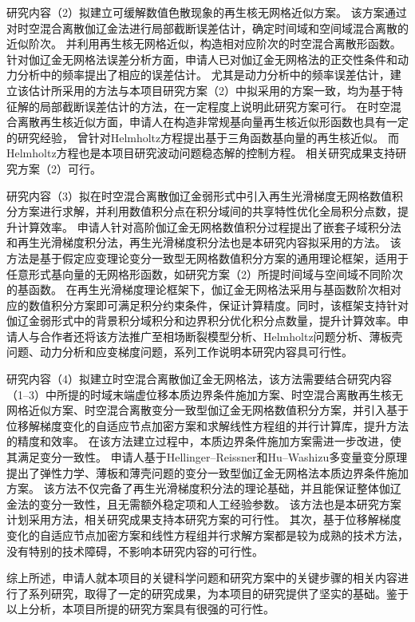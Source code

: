 研究内容（2）拟建立可缓解数值色散现象的再生核无网格近似方案。
该方案通过对时空混合离散伽辽金法进行局部截断误差估计，确定时间域和空间域混合离散的近似阶次。
并利用再生核无网格近似，构造相对应阶次的时空混合离散形函数。
针对伽辽金无网格法误差分析方面，申请人已对伽辽金无网格法的正交性条件\cite{wu2021}和动力分析中的频率\cite{wu2018a}提出了相应的误差估计。
尤其是动力分析中的频率误差估计，建立该估计所采用的方法与本项目研究方案（2）中拟采用的方案一致，均为基于特征解的局部截断误差估计的方法，在一定程度上说明此研究方案可行。
在时空混合离散再生核近似方面，申请人在构造非常规基向量再生核近似形函数也具有一定的研究经验，
曾针对Helmholtz方程提出基于三角函数基向量的再生核近似\cite{wang2020b}。
而Helmholtz方程也是本项目研究波动问题稳态解的控制方程。
相关研究成果支持研究方案（2）可行。

研究内容（3）拟在时空混合离散伽辽金弱形式中引入再生光滑梯度无网格数值积分方案进行求解，并利用数值积分点在积分域间的共享特性优化全局积分点数，提升计算效率。
申请人针对高阶伽辽金无网格数值积分过程提出了嵌套子域积分法\cite{wang2016b}和再生光滑梯度积分法\cite{wang2019a}，再生光滑梯度积分法也是本研究内容拟采用的方法。
该方法是基于假定应变理论变分一致型无网格数值积分方案的通用理论框架，适用于任意形式基向量的无网格形函数，如研究方案（2）所提时间域与空间域不同阶次的基函数。
在再生光滑梯度理论框架下，伽辽金无网格法采用与基函数阶次相对应的数值积分方案即可满足积分约束条件，保证计算精度。同时，该框架支持针对伽辽金弱形式中的背景积分域积分和边界积分优化积分点数量，提升计算效率。申请人与合作者还将该方法推广至相场断裂模型分析\cite{wu2020a}、Helmholtz问题分析\cite{wang2020b}、薄板壳问题\cite{wu2023,wu2024}、动力分析\cite{Fu2022}和应变梯度问题\cite{du2022}，系列工作说明本研究内容具可行性。

研究内容（4）拟建立时空混合离散伽辽金无网格法，该方法需要结合研究内容（1--3）中所提的时域末端虚位移本质边界条件施加方案、时空混合离散再生核无网格近似方案、时空混合离散变分一致型伽辽金无网格数值积分方案，并引入基于位移解梯度变化的自适应节点加密方案和求解线性方程组的并行计算库，提升方法的精度和效率。
在该方法建立过程中，本质边界条件施加方案需进一步改进，使其满足变分一致性。
申请人基于Hellinger--Reissner和Hu--Washizu多变量变分原理提出了弹性力学、薄板和薄壳问题的变分一致型伽辽金无网格法本质边界条件施加方案\cite{Wu2022b,wu2023,wu2024}。
该方法不仅完备了再生光滑梯度积分法的理论基础，并且能保证整体伽辽金法的变分一致性，且无需额外稳定项和人工经验参数。
该方法也是本研究方案计划采用方法，相关研究成果支持本研究方案的可行性。
其次，基于位移解梯度变化的自适应节点加密方案和线性方程组并行求解方案都是较为成熟的技术方法，没有特别的技术障碍，不影响本研究内容的可行性。

综上所述，申请人就本项目的关键科学问题和研究方案中的关键步骤的相关内容进行了系列研究，取得了一定的研究成果，为本项目的研究提供了坚实的基础。鉴于以上分析，本项目所提的研究方案具有很强的可行性。

